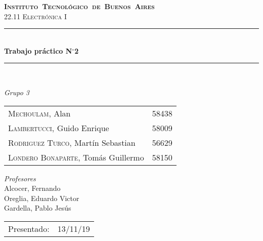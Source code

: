 \begin{titlepage}
\newcommand{\HRule}{\rule{\linewidth}{0.5mm}}
\center
\mbox{\textsc{\LARGE \bfseries {Instituto Tecnológico de Buenos Aires}}}\\[1.5cm]
\textsc{\Large 22.11 Electrónica I}\\[0.5cm]


\HRule \\[0.6cm]
{ \Huge \bfseries Trabajo práctico N$^{\circ}$2}\\[0.4cm] 
\HRule \\[1.5cm]


{\large

\emph{Grupo 3}\\
\vspace{3px}

\begin{tabular}{lr} 	
\textsc{Mechoulam}, Alan  &  58438\\
\textsc{Lambertucci}, Guido Enrique  & 58009 \\
\textsc{Rodriguez Turco}, Martín Sebastian  & 56629 \\
\textsc{Londero Bonaparte}, Tomás Guillermo  & 58150 \\
\end{tabular}

\vspace{20px}

\emph{Profesores}\\
Alcocer, Fernando\\
Oreglia, Eduardo Victor\\
Gardella, Pablo Jesús\\
\vspace{3px}

\vspace{100px}

\begin{tabular}{ll}

Presentado: & 13/11/19\\

\end{tabular}

}

\vfill

\end{titlepage}
